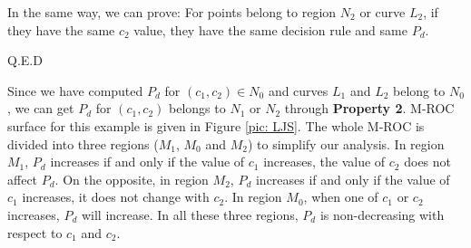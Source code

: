 In the same way, we can prove: For points belong to region $N_2$ or curve $L_2$, if they have the same $c_2$ value, they have the same decision rule and same $P_d$.

Q.E.D

Since we have computed $P_d$ for $(c_1, c_2) \in N_0$ and curves $L_1$ and $L_2$ belong to $N_0$, we can get $P_d$ for $(c_1, c_2)$ belongs to $N_1$ or $N_2$ through \textbf{Property 2}. M-ROC surface for this example is given in Figure  \ref{pic: LJS}.
The whole M-ROC is divided into three regions ($M_1$, $M_0$ and $M_2$) to simplify our analysis. In region $M_1$, $P_d$ increases if and only if the value of $c_1$ increases, the value of $c_2$ does not affect $P_d$. On the opposite, in region $M_2$, $P_d$ increases if and only if the value of $c_1$ increases, it does not change with $c_2$. In region $M_0$, when one of $c_1$ or $c_2$ increases, $P_d$ will increase. In all these three regions, $P_d$ is non-decreasing with respect to $c_1$ and $c_2$. 

